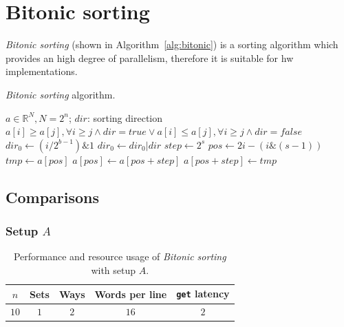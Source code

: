 \documentclass[11pt,a4paper,oneside]{memoir}
\begin{document}
\section{Bitonic sorting}
\emph{Bitonic sorting} (shown in Algorithm~\ref{alg:bitonic}) is a sorting
algorithm which provides an high degree of parallelism, therefore it is
suitable for \acl{hw} implementations.

\begin{algorithm}
	\caption{\emph{Bitonic sorting} algorithm.}\label{alg:bitonic}
	\begin{algorithmic}
		\Require $a \in \mathbb{R}^N, N = 2^n$; $dir$: sorting direction
		\Ensure $a[i] \geq a[j], \forall i \geq j \wedge dir = true \vee
			a[i] \leq a[j], \forall i \geq j \wedge dir = false$
						\State $dir_0 \gets
							(i/2^{b - 1}) \& 1$
						\State $dir_0 \gets dir_0 | dir$
						\State $step \gets 2^s$
						\State $pos \gets 2 i -
							(i \& (s - 1))$
							\State $tmp \gets a[pos]$
							\State $a[pos] \gets
								a[pos + step]$
							\State $a[pos + step]
								\gets tmp$
						\EndIf
					\EndFor
				\EndFor
			\EndFor
		\EndProcedure
	\end{algorithmic}
\end{algorithm}

\subsection{Comparisons}
\subsubsection{Setup $A$}
\begin{table}[!htb]
	\begin{center}
		\begin{tabular}{ccccc}
			\hline
			\rowcolor{gray!50}
			\textbf{$n$} & \textbf{Sets} & \textbf{Ways} &
			\textbf{Words per line} & \textbf{\texttt{get} latency} \\
			\hline
			$10$ & $1$ & $2$ & $16$ & $2$ \\
			\hline
		\end{tabular}
	\end{center}
	\caption{Performance and resource usage of \emph{Bitonic sorting}
	with setup $A$.}
	\label{tab:bitonic_setup_a}
\end{table}
\end{document}

